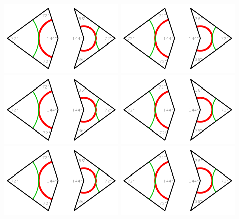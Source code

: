 \documentclass{zusammenfassung}
\begin{document}
\includegraphics[width=0.45\textwidth]{penrose_kite_dart.png}
\includegraphics[width=0.45\textwidth]{penrose_kite_dart.png}\\[0.2cm]
\includegraphics[width=0.45\textwidth]{penrose_kite_dart.png}
\includegraphics[width=0.45\textwidth]{penrose_kite_dart.png}\\[0.2cm]
\includegraphics[width=0.45\textwidth]{penrose_kite_dart.png}
\includegraphics[width=0.45\textwidth]{penrose_kite_dart.png}
\end{document}
